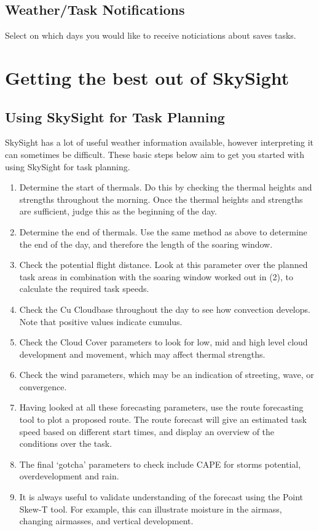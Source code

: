 \documentclass[11pt,a4paper]{article}
\begin{document}
\subsection{Weather/Task Notifications}
Select on which days you would like to receive noticiations about saves tasks.

\section{Getting the best out of SkySight}
\subsection{Using SkySight for Task Planning}\label{subsec:taskplan}
SkySight has a lot of useful weather information available, however interpreting it can sometimes be difficult. These basic steps below aim to get you started with using SkySight for task planning.

\begin{enumerate}
\item Determine the start of thermals. Do this by checking the thermal heights and strengths throughout the morning. Once the thermal heights and strengths are sufficient, judge this as the beginning of the day.
\item Determine the end of thermals. Use the same method as above to determine the end of the day, and therefore the length of the soaring window.
\item Check the potential flight distance. Look at this parameter over the planned task areas in combination with the soaring window worked out in (2), to calculate the required task speeds.
\item Check the Cu Cloudbase throughout the day to see how convection develops. Note that positive values indicate cumulus.
\item Check the Cloud Cover  parameters to look for low, mid and high level cloud development and movement, which may affect thermal strengths.
\item Check the wind parameters, which may be an indication of streeting, wave, or convergence.
\item Having looked at all these forecasting parameters, use the route forecasting tool to plot a proposed route. The route forecast will give an estimated task speed based on different start times, and display an overview of the conditions over the task.
\item The final `gotcha' parameters to check include CAPE for storms potential, overdevelopment and rain.
\item It is always useful to validate understanding of the forecast using the Point Skew-T tool. For example, this can illustrate moisture in the airmass, changing airmasses, and vertical development.
\end{enumerate}
\end{document}

